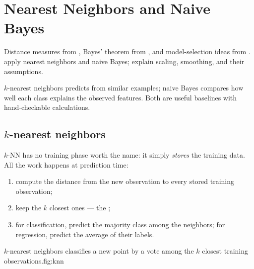 \chapter{Nearest Neighbors and Naive Bayes}
\label{ch:knn-nb}

\chapterguide%
  {Distance measures from , Bayes' theorem from , and model-selection ideas from .}
  {apply nearest neighbors and naive Bayes; explain scaling, smoothing, and their assumptions.}

$k$-nearest neighbors predicts from similar examples; naive Bayes compares how well each class explains the observed features. Both are useful baselines with hand-checkable calculations.

\section{$k$-nearest neighbors}
\label{sec:knn}

$k$-NN has no training phase worth the name: it simply \emph{stores} the training data. All the work happens at prediction time:

\begin{enumerate}
  \item compute the distance from the new observation to every stored training observation;
  \item keep the $k$ closest ones --- the ;
  \item for classification, predict the majority class among the neighbors; for regression, predict the average of their labels.
\end{enumerate}

\begin{utpfig}{$k$-nearest neighbors classifies a new point by a vote among the $k$ closest training observations.}{fig:knn}
\end{utpfig}


